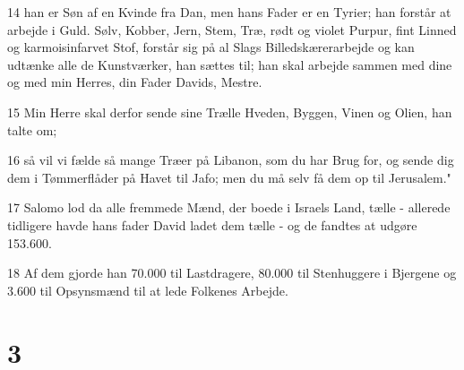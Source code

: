 \par 14 han er Søn af en Kvinde fra Dan, men hans Fader er en Tyrier; han forstår at arbejde i Guld. Sølv, Kobber, Jern, Stem, Træ, rødt og violet Purpur, fint Linned og karmoisinfarvet Stof, forstår sig på al Slags Billedskærerarbejde og kan udtænke alle de Kunstværker, han sættes til; han skal arbejde sammen med dine og med min Herres, din Fader Davids, Mestre.
\par 15 Min Herre skal derfor sende sine Trælle Hveden, Byggen, Vinen og Olien, han talte om;
\par 16 så vil vi fælde så mange Træer på Libanon, som du har Brug for, og sende dig dem i Tømmerflåder på Havet til Jafo; men du må selv få dem op til Jerusalem."
\par 17 Salomo lod da alle fremmede Mænd, der boede i Israels Land, tælle - allerede tidligere havde hans fader David ladet dem tælle - og de fandtes at udgøre 153.600.
\par 18 Af dem gjorde han 70.000 til Lastdragere, 80.000 til Stenhuggere i Bjergene og 3.600 til Opsynsmænd til at lede Folkenes Arbejde.

\chapter{3}

